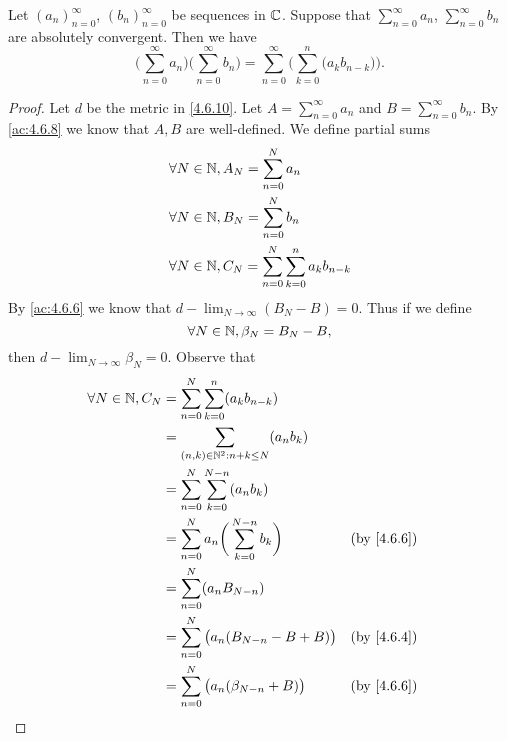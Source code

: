 \begin{ac}\label{ac:4.6.9}
  Let \((a_n)_{n = 0}^\infty\), \((b_n)_{n = 0}^\infty\) be sequences in \(\mathbb{C}\).
  Suppose that \(\sum_{n = 0}^\infty a_n\), \(\sum_{n = 0}^\infty b_n\) are absolutely convergent.
  Then we have
  \[
    \bigg(\sum_{n = 0}^\infty a_n\bigg) \bigg(\sum_{n = 0}^\infty b_n\bigg) = \sum_{n = 0}^\infty \bigg(\sum_{k = 0}^n \big(a_k b_{n - k}\big)\bigg).
  \]
\end{ac}

\begin{proof}
  Let \(d\) be the metric in \cref{4.6.10}.
  Let \(A = \sum_{n = 0}^\infty a_n\) and \(B = \sum_{n = 0}^\infty b_n\).
  By \cref{ac:4.6.8} we know that \(A, B\) are well-defined.
  We define partial sums
  \begin{align*}
     & \forall N \in \mathbb{N}, A_N = \sum_{n = 0}^N a_n                          \\
     & \forall N \in \mathbb{N}, B_N = \sum_{n = 0}^N b_n                          \\
     & \forall N \in \mathbb{N}, C_N = \sum_{n = 0}^N \sum_{k = 0}^n a_k b_{n - k}
  \end{align*}
  By \cref{ac:4.6.6} we know that \(d - \lim_{N \to \infty} (B_N - B) = 0\).
  Thus if we define
  \[
    \forall N \in \mathbb{N}, \beta_N = B_N - B,
  \]
  then \(d - \lim_{N \to \infty} \beta_N = 0\).
  Observe that
  \begin{align*}
    \forall N \in \N, C_N & = \sum_{n = 0}^N \sum_{k = 0}^n (a_k b_{n - k})                                                       \\
                          & = \sum_{(n, k) \in \N^2 : n + k \leq N} (a_n b_k)                                                     \\
                          & = \sum_{n = 0}^N \sum_{k = 0}^{N - n} (a_n b_k)                                                       \\
                          & = \sum_{n = 0}^N a_n \bigg(\sum_{k = 0}^{N - n} b_k\bigg)               &  & \text{(by \cref{4.6.6})} \\
                          & = \sum_{n = 0}^N (a_n B_{N - n})                                                                      \\
                          & = \sum_{n = 0}^N \big(a_n (B_{N - n} - B + B)\big)                      &  & \text{(by \cref{4.6.4})} \\
                          & = \sum_{n = 0}^N \big(a_n (\beta_{N - n} + B)\big)                      &  & \text{(by \cref{4.6.6})} \\

\end{align*}
\end{proof}
